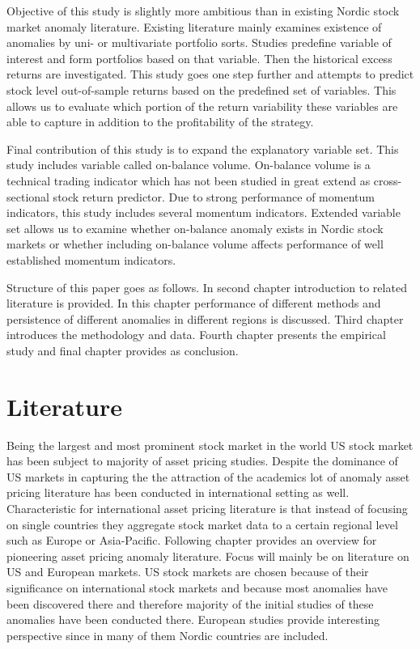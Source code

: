 \documentclass{article}
\begin{document}
Objective of this study is slightly more ambitious than in existing Nordic stock market anomaly literature. Existing literature mainly examines existence of anomalies by uni- or multivariate portfolio sorts. Studies predefine variable of interest and form portfolios based on that variable. Then the historical excess returns are investigated. This study goes one step further and attempts to predict stock level out-of-sample returns based on the predefined set of variables. This allows us to evaluate which portion of the return variability these variables are able to capture in addition to the profitability of the strategy.

Final contribution of this study is to expand the explanatory variable set. This study includes variable called on-balance volume. On-balance volume is a technical trading indicator which has not been studied in great extend as cross-sectional stock return predictor. Due to strong performance of momentum indicators, this study includes several momentum indicators. Extended variable set allows us to examine whether on-balance anomaly exists in Nordic stock markets or whether including on-balance volume affects performance of well established momentum indicators.


Structure of this paper goes as follows. In second chapter introduction to related literature is provided. In this chapter performance of different methods and persistence of different anomalies in different regions is discussed. Third chapter introduces the methodology and data. Fourth chapter presents the empirical study and final chapter provides as conclusion.


\section{Literature}\label{Literature}
Being the largest and most prominent stock market in the world US stock market has been subject to majority of asset pricing studies. Despite the dominance of US markets in capturing the the attraction of the academics lot of anomaly asset pricing literature has been conducted in international setting as well. Characteristic for international asset pricing literature is that instead of focusing on single countries they aggregate stock market data to a certain regional level such as Europe or Asia-Pacific. Following chapter provides an overview for pioneering asset pricing anomaly literature. Focus will mainly be on literature on US and European markets. US stock markets are chosen because of their significance on international stock markets and because most anomalies have been discovered there and therefore majority of the initial studies of these anomalies have been conducted there. European studies provide interesting perspective since in many of them Nordic countries are included. 
\end{document}
